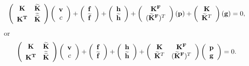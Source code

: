 \documentclass[10pt,a4paper]{article}
\begin{document}
\begin{equation*}
%
\left( \begin{array}{cc}
{\bf K} & {\bf \widetilde{K}} \\ {\bf K^T} & {\bf \widetilde{\widetilde{K}}}
\end{array} \right)
\left( \begin{array}{c}  {\bf v} \\ c  \end{array} \right)
+
\left( \begin{array}{c}  {\bf f} \\ {\bf \widetilde{f}}  \end{array} \right)
+
\left( \begin{array}{c}  {\bf h} \\ {\bf \widetilde{h}}  \end{array} \right)
+
\left( \begin{array}{c}
{\bf K^F} \\ ({\bf \widetilde{K}^F})^T
\end{array} \right)
\left( {\bf p} \right)
+
\left( \begin{array}{c}  {\bf K} \\ {\bf \widetilde{K}}^T  \end{array} \right)
\left( {\bf g} \right)
= 0,
%
\end{equation*}
%
or
%
\begin{equation*}
%
\left( \begin{array}{cc}
{\bf K} & {\bf \widetilde{K}} \\ {\bf K^T} & {\bf \widetilde{\widetilde{K}}}
\end{array} \right)
\left( \begin{array}{c}  {\bf v} \\ c  \end{array} \right)
+
\left( \begin{array}{c}  {\bf f} \\ {\bf \widetilde{f}}  \end{array} \right)
+
\left( \begin{array}{c}  {\bf h} \\ {\bf \widetilde{h}}  \end{array} \right)
+
\left( \begin{array}{cc}
{\bf K} & {\bf K^F} \\ {\bf \widetilde{K}}^T & ({\bf \widetilde{K}^F})^T
\end{array} \right)
\left( \begin{array}{c}  {\bf p} \\ {\bf g}  \end{array} \right)
= 0.
%
\end{equation*}
\end{document}
